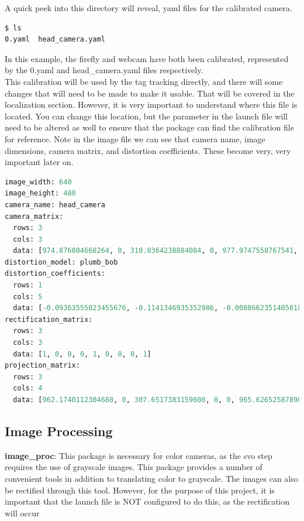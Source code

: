 \begin{itemize}
\begin{enumerate}
A quick peek into this directory will reveal, yaml files for the calibrated camera.
\begin{lstlisting}[language=bash]
$ ls
0.yaml	head_camera.yaml
\end{lstlisting}
In this example, the firefly and webcam have both been calibrated, represented by the 0.yaml and head\_camera.yaml files respectively.\\

This calibration will be used by the tag tracking directly, and there will some changes that will need to be made to make it usable. That will be covered in the localization section. However, it is very important to understand where this file is located. You can change this location, but the parameter in the launch file will need to be altered as well to ensure that the package can find the calibration file for reference. Note in the image file we can see that camera name, image dimensions, camera matrix, and distortion coefficients. These become very, very important later on.
\begin{lstlisting}[language=python] 
image_width: 640
image_height: 480
camera_name: head_camera
camera_matrix:
  rows: 3
  cols: 3
  data: [974.876804668264, 0, 310.0364238884084, 0, 977.9747558767541, 183.9139863795955, 0, 0, 1]
distortion_model: plumb_bob
distortion_coefficients:
  rows: 1
  cols: 5
  data: [-0.09363555823455676, -0.1141346935352986, -0.008866235140581833, -0.0048644735641969, 0]
rectification_matrix:
  rows: 3
  cols: 3
  data: [1, 0, 0, 0, 1, 0, 0, 0, 1]
projection_matrix:
  rows: 3
  cols: 4
  data: [962.1740112304688, 0, 307.6517383159608, 0, 0, 965.6265258789062, 181.2353823390822, 0, 0, 0, 1, 0]
\end{lstlisting}
\end{enumerate}
\end{itemize}

\subsection{Image Processing}
\noindent \textbf{image\_proc}: This package is necessary for color cameras, as the svo step requires the use of grayscale images. This package provides a number of convenient tools in addition to translating color to grayscale. The images can also be rectified through this tool. However, for the purpose of this project, it is important that the launch file is NOT configured to do this, as the rectification will occur

